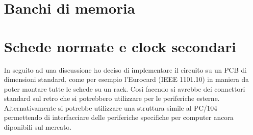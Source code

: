 \documentclass[final, ms, a4paper, 11pt]{memoir}
\newcommand\ddate{01.01.1970}
\begin{document}
\section{Banchi di memoria}

\renewcommand\ddate{06.03.2017}
\section{Schede normate e clock secondari}
In seguito ad una discussione ho deciso di implementare il circuito su un PCB di
dimensioni standard, come per esempio l'Eurocard (IEEE 1101.10) in maniera da
poter montare tutte le schede su un rack. Cos\`i facendo si avrebbe dei
connettori standard sul retro che si potrebbero utilizzare per le periferiche
esterne. Alternativamente si potrebbe utilizzare una struttura simile al PC/104
permettendo di interfacciare delle periferiche specifiche per computer ancora
diponibili sul mercato.
\end{document}
